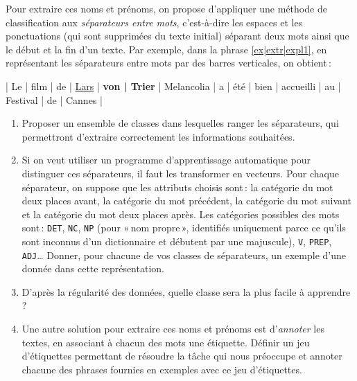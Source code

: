 \documentclass[a4paper, 11pt]{article}
\begin{document}
Pour extraire ces noms et prénoms, on propose d'appliquer une méthode de classification aux \emph{séparateurs entre mots}, c'est-à-dire les espaces et les ponctuations (qui sont supprimées du texte initial) séparant deux mots ainsi que le début et la fin d'un texte.
Par exemple, dans la phrase \ref{ex|extr|expl1}, en représentant les séparateurs entre mots par des barres verticales, on obtient :

{
    | Le | film | de | \underline{Lars} | \textbf{von | Trier} | Melancolia | a | été | bien | accueilli | au | Festival | de | Cannes |
}

\begin{enumerate}
    \item Proposer un ensemble de classes dans lesquelles ranger les séparateurs, qui permettront d'extraire correctement les informations souhaitées.

    \item Si on veut utiliser un programme d'apprentissage automatique pour distinguer ces séparateurs, il faut les transformer en vecteurs.
        Pour chaque séparateur, on suppose que les attributs choisis sont : la catégorie du mot deux places avant, la catégorie du mot précédent, la catégorie du mot suivant et la catégorie du mot deux places après.
        Les catégories possibles des mots sont : \texttt{DET}, \texttt{NC}, \texttt{NP} (pour « nom propre », identifiés uniquement parce ce qu'ils sont inconnus d'un dictionnaire et débutent par  une majuscule), \texttt{V}, \texttt{PREP}, \texttt{ADJ}…
        Donner, pour chacune de vos classes de  séparateurs, un exemple d'une donnée dans cette représentation.

    \item D'après la régularité des données, quelle classe sera la plus facile à apprendre ?

    \item Une autre solution pour extraire ces noms et prénoms est d'\emph{annoter} les textes, en associant à chacun des mots une étiquette.
        Définir un jeu d'étiquettes permettant de résoudre la tâche  qui nous préoccupe et annoter chacune des phrases fournies en exemples avec ce jeu d'étiquettes.
\end{enumerate}
\end{document}

